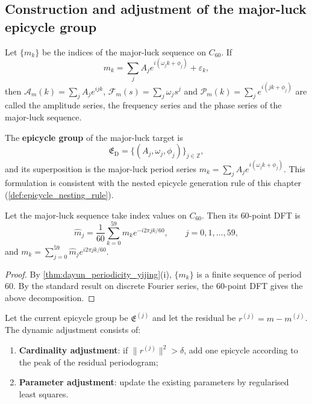 \subsection{Construction and adjustment of the major-luck epicycle group}

\begin{definition}\label{def:dayun_series_yijing}
Let $\{m_k\}$ be the indices of the major-luck sequence on $C_{60}$. If
\[
m_k=\sum_{j}A_j e^{i(\omega_j k+\phi_j)}+\varepsilon_k,
\]
then $\mathcal A_m(k)=\sum_j A_j e^{ijk}$, $\mathcal F_m(s)=\sum_j\omega_j s^j$ and $\mathcal P_m(k)=\sum_j e^{i(jk+\phi_j)}$ are called the amplitude series, the frequency series and the phase series of the major-luck sequence.
\end{definition}

\begin{definition}\label{def:dayun_epicycle_group_yijing}
The \textbf{epicycle group} of the major-luck target is
\[
\mathfrak E_{\mathrm{D}}=\{(A_j,\omega_j,\phi_j)\}_{j\in\mathbb Z},
\]
and its superposition is the major-luck period series $m_k=\sum_j A_j e^{i(\omega_j k+\phi_j)}$. This formulation is consistent with the nested epicycle generation rule of this chapter (\cref{def:epicycle_nesting_rule}).
\end{definition}

\begin{proposition}\label{prop:dayun_fourier_yijing}
Let the major-luck sequence take index values on $C_{60}$. Then its $60$-point DFT is
\[
\hat m_j=\frac{1}{60}\sum_{k=0}^{59}m_k e^{-i2\pi jk/60},\qquad j=0,1,\dots,59,
\]
and $m_k=\sum_{j=0}^{59}\hat m_j e^{i2\pi jk/60}$.
\end{proposition}

\begin{proof}
By \cref{thm:dayun_periodicity_yijing}(i), $\{m_k\}$ is a finite sequence of period $60$. By the standard result on discrete Fourier series, the $60$-point DFT gives the above decomposition.
\end{proof}

\begin{definition}\label{def:dayun_adaptive_yijing}
Let the current epicycle group be $\mathfrak E^{(j)}$ and let the residual be $r^{(j)}=m-m^{(j)}$. The dynamic adjustment consists of:
\begin{enumerate}[label=(\roman*)]
    \item \textbf{Cardinality adjustment}: if $\|r^{(j)}\|^2>\delta$, add one epicycle according to the peak of the residual periodogram;
    \item \textbf{Parameter adjustment}: update the existing parameters by regularised least squares.
\end{enumerate}
\end{definition}

